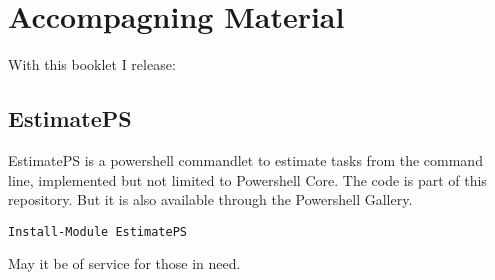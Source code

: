 \hypertarget{accompagning-material}{%
\section{Accompagning Material}\label{accompagning-material}}

With this booklet I release:

\hypertarget{estimateps}{%
\subsection{EstimatePS}\label{estimateps}}

EstimatePS is a powershell commandlet to estimate tasks from the command
line, implemented but not limited to Powershell Core. The code is part
of this repository. But it is also available through the Powershell
Gallery.

\begin{verbatim}
Install-Module EstimatePS
\end{verbatim}

May it be of service for those in need.
